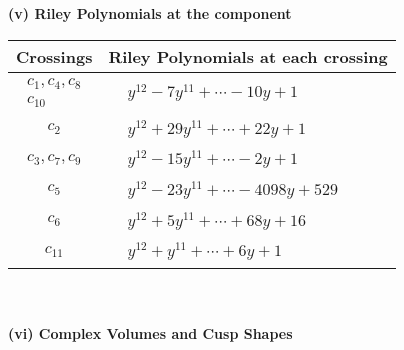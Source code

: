 \documentclass[1p]{elsarticle_modified}
\theoremstyle{definition}
\begin{document}
\newpage\renewcommand{\arraystretch}{1}
\flushleft \textbf{(v) Riley Polynomials at the component}\newline \\
\begin{tabular}{m{50pt}|m{274pt}}
Crossings & \hspace{64pt}Riley Polynomials at each crossing \\
\hline $$\begin{aligned}c_{1},c_{4},c_{8}\\c_{10}\end{aligned}$$&$\begin{aligned}
&y^{12}-7 y^{11}+\cdots-10 y+1
\end{aligned}$\\
\hline $$\begin{aligned}c_{2}\end{aligned}$$&$\begin{aligned}
&y^{12}+29 y^{11}+\cdots+22 y+1
\end{aligned}$\\
\hline $$\begin{aligned}c_{3},c_{7},c_{9}\end{aligned}$$&$\begin{aligned}
&y^{12}-15 y^{11}+\cdots-2 y+1
\end{aligned}$\\
\hline $$\begin{aligned}c_{5}\end{aligned}$$&$\begin{aligned}
&y^{12}-23 y^{11}+\cdots-4098 y+529
\end{aligned}$\\
\hline $$\begin{aligned}c_{6}\end{aligned}$$&$\begin{aligned}
&y^{12}+5 y^{11}+\cdots+68 y+16
\end{aligned}$\\
\hline $$\begin{aligned}c_{11}\end{aligned}$$&$\begin{aligned}
&y^{12}+y^{11}+\cdots+6 y+1
\end{aligned}$\\
\hline
\end{tabular}\\~\\
\newpage\flushleft \textbf{(vi) Complex Volumes and Cusp Shapes}
\end{document}

